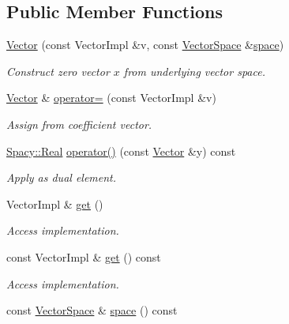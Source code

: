 \subsection*{Public Member Functions}
\begin{DoxyCompactItemize}
\item 
\hyperlink{classSpacy_1_1Generic_1_1Vector_a35622c4a7a184c2d6ff951bbde6a871c}{Vector} (const Vector\+Impl \&v, const \hyperlink{classSpacy_1_1VectorSpace}{Vector\+Space} \&\hyperlink{classSpacy_1_1VectorBase_aa999dbf9d679d895dfe04c10fbf9f5e9}{space})
\begin{DoxyCompactList}\small\item\em Construct zero vector $x$ from underlying vector space. \end{DoxyCompactList}\item 
\hyperlink{classSpacy_1_1Generic_1_1Vector}{Vector} \& \hyperlink{classSpacy_1_1Generic_1_1Vector_acec9492900de215a4e3d4b16129fbadd}{operator=} (const Vector\+Impl \&v)
\begin{DoxyCompactList}\small\item\em Assign from coefficient vector. \end{DoxyCompactList}\item 
\hyperlink{classSpacy_1_1Real}{Spacy\+::\+Real} \hyperlink{classSpacy_1_1Generic_1_1Vector_acf676aac17118e0b3b7d6b08f026d641}{operator()} (const \hyperlink{classSpacy_1_1Generic_1_1Vector}{Vector} \&y) const 
\begin{DoxyCompactList}\small\item\em Apply as dual element. \end{DoxyCompactList}\item 
\hypertarget{classSpacy_1_1Mixin_1_1Get_aaa3afedcb9b9e943f81d1686b70417db}{}Vector\+Impl \& \hyperlink{classSpacy_1_1Mixin_1_1Get_aaa3afedcb9b9e943f81d1686b70417db}{get} ()\label{classSpacy_1_1Mixin_1_1Get_aaa3afedcb9b9e943f81d1686b70417db}

\begin{DoxyCompactList}\small\item\em Access implementation. \end{DoxyCompactList}\item 
\hypertarget{classSpacy_1_1Mixin_1_1Get_ab00e550fb3ac8208d0a25e17e705a9fc}{}const Vector\+Impl \& \hyperlink{classSpacy_1_1Mixin_1_1Get_ab00e550fb3ac8208d0a25e17e705a9fc}{get} () const\label{classSpacy_1_1Mixin_1_1Get_ab00e550fb3ac8208d0a25e17e705a9fc}

\begin{DoxyCompactList}\small\item\em Access implementation. \end{DoxyCompactList}\item 
\hypertarget{classSpacy_1_1VectorBase_aa999dbf9d679d895dfe04c10fbf9f5e9}{}const \hyperlink{classSpacy_1_1VectorSpace}{Vector\+Space} \& \hyperlink{classSpacy_1_1VectorBase_aa999dbf9d679d895dfe04c10fbf9f5e9}{space} () const \label{classSpacy_1_1VectorBase_aa999dbf9d679d895dfe04c10fbf9f5e9}


\end{DoxyCompactItemize}
